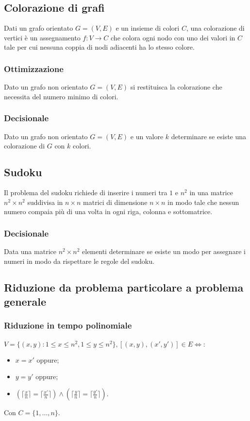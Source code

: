 \subsection{Colorazione di grafi}
Dati un grafo orientato $G=(V, E)$ e un insieme di colori $C$, una colorazione di vertici \`e un assegnamento $f:V\rightarrow C$ che colora ogni nodo con uno dei valori in $C$ tale per
cui nessuna coppia di nodi adiacenti ha lo stesso colore.
\subsubsection{Ottimizzazione}
Dato un grafo non orientato $G=(V, E)$ si restituisca la colorazione che necessita del numero minimo di colori.
\subsubsection{Decisionale}
Dato un grafo non orientato $G=(V, E)$ e un valore $k$ determinare se esiste una colorazione di $G$ con $k$ colori.
\subsection{Sudoku}
Il problema del sudoku richiede di inserire i numeri tra $1$ e $n^2$ in una matrice $n^2\times n^2$ suddivisa in $n\times n$ matrici di dimensione $n\times n$ in modo tale che nessun 
numero compaia pi\`u di una volta in ogni riga, colonna e sottomatrice.
\subsubsection{Decisionale}
Data una matrice $n^2\times n^2$ elementi determinare se esiste un modo per assegnare i numeri in modo da rispettare le regole del sudoku.
\subsection{Riduzione da problema particolare a problema generale}
\subsubsection{Riduzione in tempo polinomiale}
$V = \{(x, y):1 \le x\le n^2, 1\le y\le n^2\}, [(x, y), (x', y')]\in E\Leftrightarrow$:
\begin{itemize}
	\item $x = x'$ oppure;
	\item $y = y'$ oppure;
	\item $(\lceil\frac{x}{n}\rceil = \lceil\frac{x'}{n}\rceil)\land(\lceil\frac{y}{n}\rceil = \lceil\frac{y'}{n}\rceil)$.
\end{itemize}
Con $C = \{1, \dots, n\}$.
